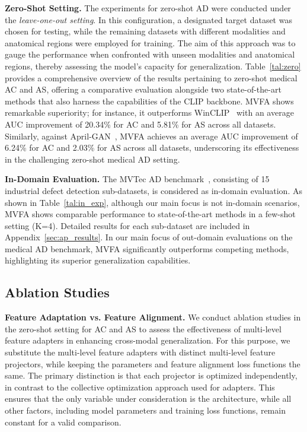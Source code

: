 \noindent\textbf{Zero-Shot Setting.}
The experiments for zero-shot AD were conducted under the \textit{leave-one-out setting}. In this configuration, a designated target dataset was chosen for testing, while the remaining datasets with different modalities and anatomical regions were employed for training. The aim of this approach was to gauge the performance when confronted with unseen modalities and anatomical regions, thereby assessing the model's capacity for generalization. Table~\ref{tal:zero} provides a comprehensive overview of the results pertaining to zero-shot medical AC and AS, offering a comparative evaluation alongside two state-of-the-art methods that also harness the capabilities of the CLIP backbone. MVFA shows remarkable superiority; for instance, it outperforms WinCLIP~\cite{winclip} with an average AUC improvement of 20.34\% for AC and 5.81\% for AS across all datasets. Similarly, against April-GAN~\cite{chen2023zero}, MVFA achieves an average AUC improvement of 6.24\% for AC and 2.03\% for AS across all datasets, underscoring its effectiveness in the challenging zero-shot medical AD setting.

\noindent\textbf{In-Domain Evaluation.} The MVTec AD benchmark~\cite{bergmann2019mvtec}, consisting of 15 industrial defect detection sub-datasets, is considered as in-domain evaluation. As shown in Table~\ref{tal:in_exp}, although our main focus is not in-domain scenarios, MVFA shows comparable performance to state-of-the-art methods in a few-shot setting (K=4). Detailed results for each sub-dataset are included in Appendix~\ref{sec:ap_results}. In our main focus of out-domain evaluations on the medical AD benchmark, MVFA significantly outperforms competing methods, highlighting its superior generalization capabilities.

\subsection{Ablation Studies}\label{sec:abl}

\textbf{Feature Adaptation vs. Feature Alignment.}
We conduct ablation studies in the zero-shot setting for AC and AS to assess the effectiveness of multi-level feature adapters in enhancing cross-modal generalization. For this purpose, we substitute the multi-level feature adapters with distinct multi-level feature projectors, while keeping the parameters and feature alignment loss functions the same. The primary distinction is that each projector is optimized independently, in contrast to the collective optimization approach used for adapters. This ensures that the only variable under consideration is the architecture, while all other factors, including model parameters and training loss functions, remain constant for a valid comparison.

